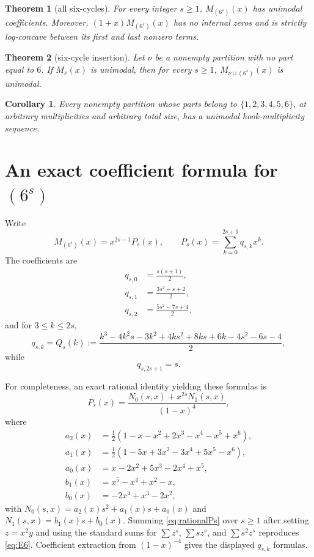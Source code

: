 \documentclass[11pt]{article}
\newtheorem{theorem}{Theorem}
\newtheorem{corollary}{Corollary}
\begin{document}
\begin{theorem}[all six-cycles]
For every integer $s\ge1$, $M_{(6^s)}(x)$ has unimodal coefficients. Moreover, $(1+x)M_{(6^s)}(x)$ has no internal zeros and is strictly log-concave between its first and last nonzero terms.
\end{theorem}

\begin{theorem}[six-cycle insertion]
Let $\nu$ be a nonempty partition with no part equal to $6$. If $M_\nu(x)$ is unimodal, then for every $s\ge1$, $M_{\nu\sqcup(6^s)}(x)$ is unimodal.
\end{theorem}

\begin{corollary}
Every nonempty partition whose parts belong to $\{1,2,3,4,5,6\}$, at arbitrary multiplicities and arbitrary total size, has a unimodal hook-multiplicity sequence.
\end{corollary}

\section{An exact coefficient formula for $(6^s)$}
Write
\[
M_{(6^s)}(x)=x^{2s-1}P_s(x),\qquad P_s(x)=\sum_{k=0}^{2s+1}q_{s,k}x^k.
\]
The coefficients are
\begin{align}
q_{s,0}&=\frac{s(s+1)}2,\\
q_{s,1}&=\frac{3s^2-s+2}{2},\\
q_{s,2}&=\frac{5s^2-7s+4}{2},
\end{align}
and for $3\le k\le2s$,
\begin{equation}
q_{s,k}=Q_s(k):=
\frac{k^3-4k^2s-3k^2+4ks^2+8ks+6k-4s^2-6s-4}{2},
\label{eq:Qs}
\end{equation}
while
\begin{equation}
q_{s,2s+1}=s.
\end{equation}

For completeness, an exact rational identity yielding these formulas is
\begin{equation}
P_s(x)=\frac{N_0(s,x)+x^{2s}N_1(s,x)}{(1-x)^4},
\label{eq:rationalPs}
\end{equation}
where
\begin{align*}
a_2(x)&=\tfrac12(1-x-x^2+2x^3-x^4-x^5+x^6),\\
a_1(x)&=\tfrac12(1-5x+3x^2-3x^4+5x^5-x^6),\\
a_0(x)&=x-2x^2+5x^3-2x^4+x^5,\\
b_1(x)&=x^5-x^4+x^2-x,\\
b_0(x)&=-2x^4+x^3-2x^2,
\end{align*}
with $N_0(s,x)=a_2(x)s^2+a_1(x)s+a_0(x)$ and $N_1(s,x)=b_1(x)s+b_0(x)$. Summing \eqref{eq:rationalPs} over $s\ge1$ after setting $z=x^2y$ and using the standard sums for $\sum z^s$, $\sum sz^s$, and $\sum s^2z^s$ reproduces \eqref{eq:E6}. Coefficient extraction from $(1-x)^{-4}$ gives the displayed $q_{s,k}$ formulas.
\end{document}
